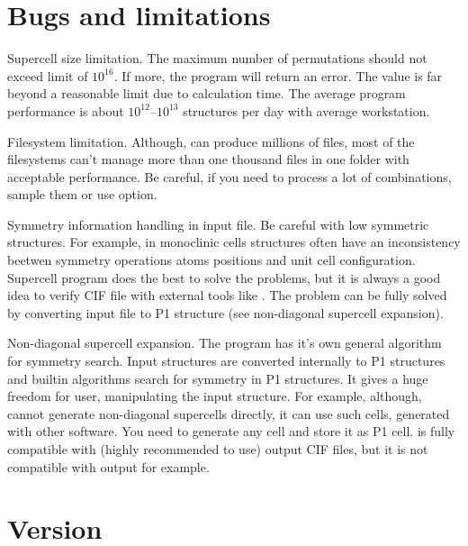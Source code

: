 \documentclass[a4paper,english]{article}
\begin{document}
\section{Bugs and limitations}

\begin{Description}\setlength{\itemsep}{0cm}
\item[Supercell size limitation.]
The maximum number of permutations should not exceed limit of $10^{16}$. If more, the program will return an error. The value is far beyond a reasonable limit due to calculation time. The average program performance is about $10^{12}$--$10^{13}$ structures per day with average workstation.
\item[Filesystem limitation.]
Although,  can produce millions of files, most of the filesystems can't manage more than one thousand files in one folder with acceptable performance. Be careful, if you need to process a lot of combinations, sample them or use  option.
\item[Symmetry information handling in input file.]
Be careful with low symmetric structures. For example, in monoclinic cells structures often have an inconsistency beetwen symmetry operations atoms positions and unit cell configuration. Supercell program does the best to solve the problems, but it is always a good idea to verify CIF file with external tools like . The problem can be fully solved by converting input file to P1 structure (see non-diagonal supercell expansion).
\item[Non-diagonal supercell expansion.]
The program has it's own general algorithm for symmetry search. Input structures are converted internally to P1 structures and builtin algorithms search for symmetry in P1 structures. It gives a huge freedom for user, manipulating the input structure. For example, although,  cannot generate non-diagonal supercells directly, it can use such cells, generated with other software. You need to generate any cell and store it as P1 cell.  is fully compatible with  (highly recommended to use) output CIF files, but it is not compatible with  output for example.
\end{Description}



\section{Version}
\end{document}
